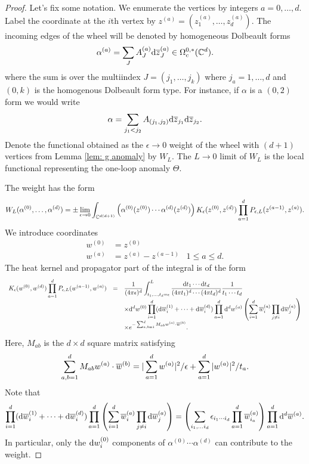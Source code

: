 \begin{proof}

Let's fix some notation. 
We enumerate the vertices by integers $a = 0,\ldots, d$. 
Label the coordinate at the $i$th vertex by $z^{(a)} = (z_1^{(a)}, \ldots, z_d^{(a)})$. 
The incoming edges of the wheel will be denoted by homogeneous Dolbeault forms 
\[
\alpha^{(a)} = \sum_{J} A^{(a)}_J \d \zbar_J^{(a)} \in \Omega_c^{0,*}(\CC^d) .
\]
where the sum is over the multiindex $J = (j_1,\ldots, j_k)$ where $j_a = 1,\ldots, d$ and $(0,k)$ is the homogenous Dolbeault form type. 
For instance, if $\alpha$ is a $(0,2)$ form we would write
\[
\alpha = \sum_{j_1 < j_2} A_{(j_1,j_2)} \d \zbar_{j_1} \d\zbar_{j_2} .
\]
Denote the functional obtained as the $\epsilon \to 0$ weight of the wheel with $(d+1)$ vertices from Lemma \ref{lem: g anomaly} by $W_L$.
The $L\to 0$ limit of $W_L$ is the local functional representing the one-loop anomaly $\Theta$. 

The weight has the form
\[
W_L(\alpha^{(0)},\ldots,\alpha^{(d)}) = \pm \lim_{\epsilon \to 0} \int_{\CC^{d(d+1)}} \left(\alpha^{(0)}(z^{(0)}) \cdots \alpha^{(d)}(z^{(d)}) \right) K_\epsilon(z^{(0)},z^{(d)}) \prod_{a =1}^d P_{\epsilon,L} (z^{(a-1)}, z^{(a)}) .
\]
We introduce coordinates
\begin{align*}
w^{(0)} & = z^{(0)} \\
w^{(a)} & = z^{(a)} - z^{(a-1)} \;\;\; 1 \leq a \leq d .
\end{align*}
The heat kernel and propagator part of the integral is of the form
\[
\begin{array}{ccl}
\displaystyle
K_\epsilon(w^{(0)},w^{(d)}) \prod_{a =1}^d P_{\epsilon,L} (w^{(a-1)}, w^{(a)}) & = & \displaystyle \frac{1}{(4 \pi \epsilon)^d} \int_{t_1,\ldots,t_d = \epsilon}^L \frac{\d t_1 \cdots \d t_d}{(4 \pi t_1)^d \cdots (4 \pi t_d)^d} \frac{1}{t_1\cdots t_d}  \\ & & \displaystyle \times \d^d w^{(0)} \prod_{i=1}^d (\d \Bar{w}^{(1)}_i + \cdots + \d \Bar{w}^{(d)}_i) \prod_{a = 1}^d \d^d w^{(a)} \left(\sum_{i = 1}^d \Bar{w}_i^{(a)} \prod_{j \ne i} \d \Bar{w}_{j}^{(a)}\right)
\\ & & \displaystyle \times e^{-\sum_{a,b = 1}^d M_{a b} w^{(a)} \cdot \Bar{w}^{(b)}} .
\end{array}
\]
Here, $M_{ab}$ is the $d \times d$ square matrix satisfying
\[
\sum_{a,b = 1}^d M_{a b} w^{(a)} \cdot \Bar{w}^{(b)} = |\sum_{a = 1}^d w^{(a)} |^2 / \epsilon + \sum_{a = 1}^d |w^{(a)}|^2 / t_a .
\]
Note that
\[
\prod_{i=1}^d (\d \Bar{w}^{(1)}_i + \cdots + \d \Bar{w}^{(d)}_i) \prod_{a = 1}^d \left(\sum_{i = 1}^d \Bar{w}_i^{(a)} \prod_{j \ne i} \d \Bar{w}_{j}^{(a)}\right) = \left( \sum_{i_1,\ldots i_d} \epsilon_{i_1\cdots i_d} \prod_{a=1}^d \Bar{w}^{(a)}_{i_a}\right) \prod_{a=1}^d \d^d \Bar{w}^{(a)} .
\]
In particular, only the $\d w_i^{(0)}$ components of $\alpha^{(0)} \cdots \alpha^{(d)}$ can contribute to the weight.


\end{proof}
